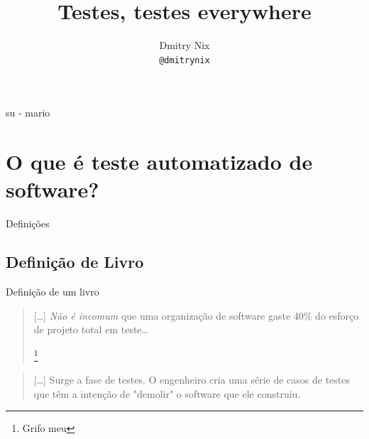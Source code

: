 \documentclass[]{beamer}
\author[Dmitry]{Dmitry Nix \\ \texttt{@dmitrynix}}
\title{Testes, testes everywhere}
\institute{ /(guru|pug-)pi/i }
\begin{document}
  \begin{frame}
    \titlepage
  \end{frame}

  \begin{frame}{su - mario}
    \tableofcontents
  \end{frame}

  \section{O que é teste automatizado de software?}

  \begin{frame}
    \begin{center}
      \Huge Definições
    \end{center}
  \end{frame}


  \subsection*{Definição de Livro}\label{def1}
  \begin{frame}
    \begin{center}
      \Huge Definição de um livro
    \end{center}
  \end{frame}

  \begin{frame}{\subsecname}
    \blockquote[{\cite[Pressman]{pressman_engenharia_1995}}]{
      [\ldots] \emph{Não é incomum} que uma organização de software gaste 40\%
      do esforço de projeto total em teste\ldots

      \let\thefootnote\relax\footnote{Grifo meu}
    }
  \end{frame}

  \begin{frame}{\subsecname}
    \blockquote[{\cite[Pressman]{pressman_engenharia_1995}}]{
      [\ldots] Surge a fase de testes. O engenheiro cria uma série de casos de testes
      que têm a intenção de "demolir" o software que ele construiu.
    }
  \end{frame}
\end{document}
